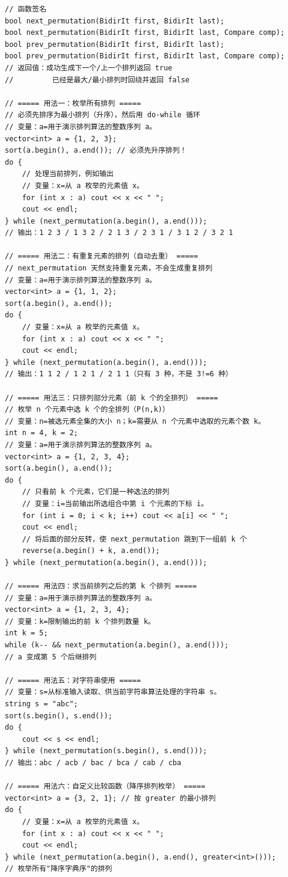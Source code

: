 \documentclass[UTF8,openany,oneside,zihao=-4]{ctexbook}
\begin{document}
\begin{lstlisting}
// 函数签名
bool next_permutation(BidirIt first, BidirIt last);
bool next_permutation(BidirIt first, BidirIt last, Compare comp);
bool prev_permutation(BidirIt first, BidirIt last);
bool prev_permutation(BidirIt first, BidirIt last, Compare comp);
// 返回值：成功生成下一个/上一个排列返回 true
//         已经是最大/最小排列时回绕并返回 false

// ===== 用法一：枚举所有排列 =====
// 必须先排序为最小排列（升序），然后用 do-while 循环
// 变量：a=用于演示排列算法的整数序列 a。
vector<int> a = {1, 2, 3};
sort(a.begin(), a.end()); // 必须先升序排列！
do {
    // 处理当前排列，例如输出
    // 变量：x=从 a 枚举的元素值 x。
    for (int x : a) cout << x << " ";
    cout << endl;
} while (next_permutation(a.begin(), a.end()));
// 输出：1 2 3 / 1 3 2 / 2 1 3 / 2 3 1 / 3 1 2 / 3 2 1

// ===== 用法二：有重复元素的排列（自动去重） =====
// next_permutation 天然支持重复元素，不会生成重复排列
// 变量：a=用于演示排列算法的整数序列 a。
vector<int> a = {1, 1, 2};
sort(a.begin(), a.end());
do {
    // 变量：x=从 a 枚举的元素值 x。
    for (int x : a) cout << x << " ";
    cout << endl;
} while (next_permutation(a.begin(), a.end()));
// 输出：1 1 2 / 1 2 1 / 2 1 1（只有 3 种，不是 3!=6 种）

// ===== 用法三：只排列部分元素（前 k 个的全排列） =====
// 枚举 n 个元素中选 k 个的全排列（P(n,k)）
// 变量：n=被选元素全集的大小 n；k=需要从 n 个元素中选取的元素个数 k。
int n = 4, k = 2;
// 变量：a=用于演示排列算法的整数序列 a。
vector<int> a = {1, 2, 3, 4};
sort(a.begin(), a.end());
do {
    // 只看前 k 个元素，它们是一种选法的排列
    // 变量：i=当前输出所选组合中第 i 个元素的下标 i。
    for (int i = 0; i < k; i++) cout << a[i] << " ";
    cout << endl;
    // 将后面的部分反转，使 next_permutation 跳到下一组前 k 个
    reverse(a.begin() + k, a.end());
} while (next_permutation(a.begin(), a.end()));

// ===== 用法四：求当前排列之后的第 k 个排列 =====
// 变量：a=用于演示排列算法的整数序列 a。
vector<int> a = {1, 2, 3, 4};
// 变量：k=限制输出的前 k 个排列数量 k。
int k = 5;
while (k-- && next_permutation(a.begin(), a.end()));
// a 变成第 5 个后继排列

// ===== 用法五：对字符串使用 =====
// 变量：s=从标准输入读取、供当前字符串算法处理的字符串 s。
string s = "abc";
sort(s.begin(), s.end());
do {
    cout << s << endl;
} while (next_permutation(s.begin(), s.end()));
// 输出：abc / acb / bac / bca / cab / cba

// ===== 用法六：自定义比较函数（降序排列枚举） =====
vector<int> a = {3, 2, 1}; // 按 greater 的最小排列
do {
    // 变量：x=从 a 枚举的元素值 x。
    for (int x : a) cout << x << " ";
    cout << endl;
} while (next_permutation(a.begin(), a.end(), greater<int>()));
// 枚举所有"降序字典序"的排列
\end{lstlisting}
\end{document}
